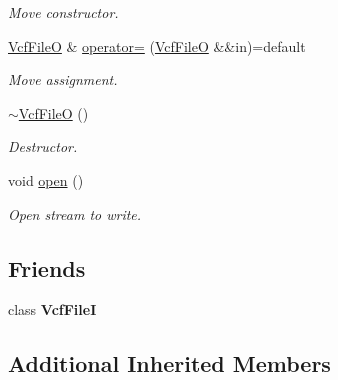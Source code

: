 \begin{DoxyCompactItemize}
\begin{DoxyCompactList}\small\item\em Move constructor. \end{DoxyCompactList}\item 
\mbox{\label{classvarfiles_1_1_vcf_file_o_a0f6be322f2dbee698e48a8bd42e5716c}} 
\hyperlink{classvarfiles_1_1_vcf_file_o}{Vcf\+FileO} \& \hyperlink{classvarfiles_1_1_vcf_file_o_a0f6be322f2dbee698e48a8bd42e5716c}{operator=} (\hyperlink{classvarfiles_1_1_vcf_file_o}{Vcf\+FileO} \&\&in)=default
\begin{DoxyCompactList}\small\item\em Move assignment. \end{DoxyCompactList}\item 
\mbox{\label{classvarfiles_1_1_vcf_file_o_afdf10d39bb76c10fe25d84cdeff6d096}} 
\hyperlink{classvarfiles_1_1_vcf_file_o_afdf10d39bb76c10fe25d84cdeff6d096}{$\sim$\+Vcf\+FileO} ()
\begin{DoxyCompactList}\small\item\em Destructor. \end{DoxyCompactList}\item 
\mbox{\label{classvarfiles_1_1_vcf_file_o_a6b88a49806da3af908bef1cd874fde4f}} 
void \hyperlink{classvarfiles_1_1_vcf_file_o_a6b88a49806da3af908bef1cd874fde4f}{open} ()
\begin{DoxyCompactList}\small\item\em Open stream to write. \end{DoxyCompactList}\end{DoxyCompactItemize}
\subsection*{Friends}
\begin{DoxyCompactItemize}
\item 
\mbox{\label{classvarfiles_1_1_vcf_file_o_a3118fbcd4def37c19a67e608fab09ba6}} 
class {\bfseries Vcf\+FileI}
\end{DoxyCompactItemize}
\subsection*{Additional Inherited Members}


